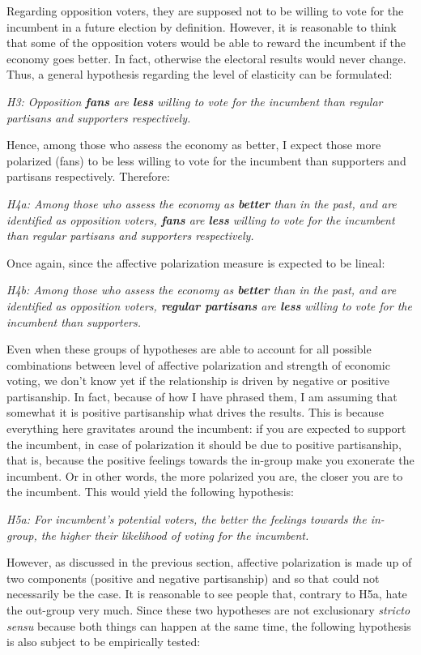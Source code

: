 \documentclass[a4paper, svgnames]{article}
\begin{document}
Regarding opposition voters, they are supposed not to be willing to vote for the incumbent in a future election by definition. However, it is reasonable to think that some of the opposition voters would be able to reward the incumbent if the economy goes better. In fact, otherwise the electoral results would never change. Thus, a general hypothesis regarding the level of elasticity can be formulated:

\textit{H3: Opposition \textbf{fans} are \textbf{less} willing to vote for the incumbent than regular partisans and supporters respectively.}

Hence, among those who assess the economy as better, I expect those more polarized (fans) to be less willing to vote for the incumbent than supporters and partisans respectively. Therefore:

\textit{H4a: Among those who assess the economy as \textbf{better} than in the past, and are identified as opposition voters, \textbf{fans} are \textbf{less} willing to vote for the incumbent than regular partisans and supporters respectively.}

Once again, since the affective polarization measure is expected to be lineal:

\textit{H4b: Among those who assess the economy as \textbf{better} than in the past, and are identified as opposition voters, \textbf{regular partisans} are \textbf{less} willing to vote for the incumbent than supporters.}

Even when these groups of hypotheses are able to account for all possible combinations between level of affective polarization and strength of economic voting, we don't know yet if the relationship is driven by negative or positive partisanship. In fact, because of how I have phrased them, I am assuming that somewhat it is positive partisanship what drives the results. This is because everything here gravitates around the incumbent: if you are expected to support the incumbent, in case of polarization it should be due to positive partisanship, that is, because the positive feelings towards the in-group make you exonerate the incumbent. Or in other words, the more polarized you are, the closer you are to the incumbent. This would yield the following hypothesis:

\textit{H5a: For incumbent's potential voters, the better the feelings towards the in-group, the higher their likelihood of voting for the incumbent.}

However, as discussed in the previous section, affective polarization is made up of two components (positive and negative partisanship) and so that could not necessarily be the case. It is reasonable to see people that, contrary to H5a, hate the out-group very much. Since these two hypotheses are not exclusionary \textit{stricto sensu} because both things can happen at the same time, the following hypothesis is also subject to be empirically tested:
\end{document}
